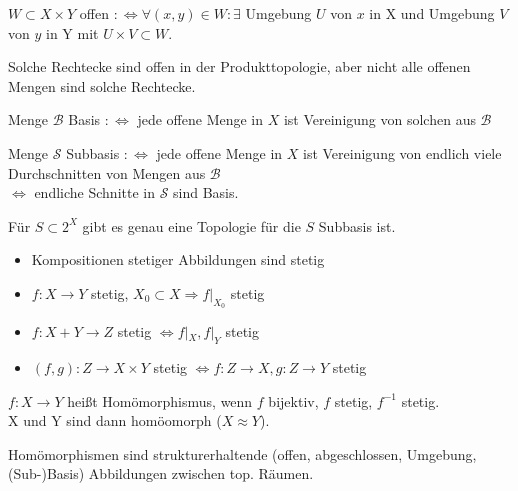 \begin{defi}[Produkttopologie]
  $W \subset X\times Y$ offen
  $:\Leftrightarrow \forall (x,y) \in W: \exists$
  Umgebung $U$ von $x$ in X und Umgebung $V$ von $y$ in Y
  mit $U \times V \subset W$.
\end{defi}

\begin{bem}
  Solche \glqq Rechtecke\grqq{} sind offen in der Produkttopologie,
  aber nicht alle offenen Mengen sind solche Rechtecke.
\end{bem}

\begin{defi}[Basis]
  Menge $\mathcal{B}$ Basis $:\Leftrightarrow$ jede offene Menge
  in $X$ ist Vereinigung von solchen aus $\mathcal{B}$
\end{defi}

\begin{defi}[Subbasis]
  Menge $\mathcal{S}$ Subbasis $:\Leftrightarrow$ jede offene Menge
  in $X$ ist Vereinigung von endlich viele Durchschnitten
  von Mengen aus $\mathcal{B}$\\
  $\Leftrightarrow$ endliche Schnitte in $\mathcal{S}$ sind Basis.
\end{defi}

\begin{bem}
  Für $S \subset 2^X$ gibt es genau eine Topologie für die $S$ Subbasis ist.
\end{bem}

\begin{bem}
  \begin{itemize}
    \item Kompositionen stetiger Abbildungen sind stetig
    \item $f:X\to Y$ stetig, $X_0 \subset X \Rightarrow f|_{X_0}$ stetig
    \item $f:X+Y\to Z$ stetig $\Leftrightarrow f|_X, f|_Y$ stetig
    \item $(f,g): Z\to X\times Y$ stetig $\Leftrightarrow f:Z\to X, g:Z\to Y$ stetig
  \end{itemize}
\end{bem}

\begin{defi}[Homömorphismus]
  $f:X\to Y$ heißt Homömorphismus, wenn $f$ bijektiv, $f$ stetig, $f^{-1}$ stetig.\\
  X und Y sind dann homöomorph ($X\approx Y$).
\end{defi}

\begin{bem}
  Homömorphismen sind strukturerhaltende (offen, abgeschlossen, Umgebung, (Sub-)Basis) 
  Abbildungen zwischen top. Räumen.
\end{bem}

